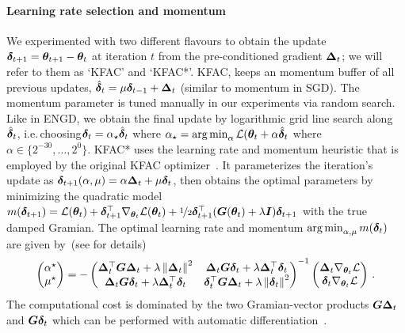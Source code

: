 \paragraph{Learning rate selection and momentum}
We experimented with two different flavours to obtain the update ${\bm{\delta}}_{t+1} = {\bm{\theta}}_{t+1} - {\bm{\theta}}_t$ at iteration $t$ from the pre-conditioned gradient ${\bm{\Delta}}_t$; we will refer to them as `KFAC' and `KFAC*'.
KFAC, keeps an momentum buffer of all previous updates, $\hat{{\bm{\delta}}}_t = \mu {\bm{\delta}}_{t-1} + {\bm{\Delta}}_t$ (similar to momentum in SGD).
The momentum parameter is tuned manually in our experiments via random search.
Like in ENGD, we obtain the final update by logarithmic grid line search along $\hat{{\bm{\delta}}}_t$, i.e.\,choosing${\bm{\delta}}_t = \alpha_{\star} \hat{{\bm{\delta}}}_t$ where $\alpha_{\star} = \operatorname*{arg\,min}_{\alpha} {\mathcal{L}}({\bm{\theta}}_t + \alpha \hat{{\bm{\delta}}}_t$ where $\alpha \in \{2^{-30}, \dots, 2^0\}$.
KFAC* uses the learning rate and momentum heuristic that is employed by the original KFAC optimizer~\cite{martens2015optimizing}.
It parameterizes the iteration's update as ${\bm{\delta}}_{t+1}(\alpha, \mu) = \alpha {\bm{\Delta}}_t + \mu {\bm{\delta}}_t$, then obtains the optimal parameters by minimizing the quadratic model $m({\bm{\delta}}_{t+1}) = {\mathcal{L}}({\bm{\theta}}_t) + {\bm{\delta}}_{t+1}^{\top} \nabla_{{\bm{\theta}}_t}{\mathcal{L}}({\bm{\theta}}_t) + \nicefrac{1}{2}{\bm{\delta}}_{t+1}^{\top} ({\bm{G}}({\bm{\theta}}_t) + \lambda {\bm{I}}) {\bm{\delta}}_{t+1}$ with the true damped Gramian.
The optimal learning rate and momentum $\operatorname*{arg\,min}_{\alpha, \mu} m({\bm{\delta}}_t)$ are given by~(see \citep[][Section 7]{martens2015optimizing} for details)
\begin{align}
  \begin{pmatrix}
    \alpha^{\star} \\ \mu^{\star}
  \end{pmatrix}
  =
  -
  \begin{pmatrix}
    {\bm{\Delta}}_t^{\top} {\bm{G}} {\bm{\Delta}}_t + \lambda \left\lVert {\bm{\Delta}}_t \right\rVert^2
    & {\bm{\Delta}}_t {\bm{G}} {\bm{\delta}}_t + \lambda {\bm{\Delta}}^{\top}_t {\bm{\delta}}_t
    \\
    {\bm{\Delta}}_t {\bm{G}} {\bm{\delta}}_t + \lambda {\bm{\Delta}}^{\top}_t {\bm{\delta}}_t
    &
      {\bm{\delta}}_t^{\top} {\bm{G}} {\bm{\Delta}}_t + \lambda \left\lVert {\bm{\delta}}_t \right\rVert^2
  \end{pmatrix}^{-1}
  \begin{pmatrix}
    {\bm{\Delta}}_t \nabla_{{\bm{\theta}}_t} {\mathcal{L}}
    \\
    {\bm{\delta}}_t \nabla_{{\bm{\theta}}_t} {\mathcal{L}}
  \end{pmatrix}\,.
\end{align}
The computational cost is dominated by the two Gramian-vector products ${\bm{G}} {\bm{\Delta}}_t$ and ${\bm{G}} {\bm{\delta}}_t$ which can be performed with automatic differentiation~\cite{pearlmutter1994fast,schraudolph2002fast}.
